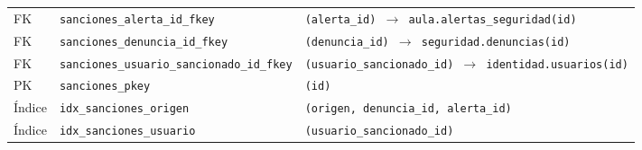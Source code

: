 {\begin{xltabular}{\textwidth}{@{}>{\raggedright\arraybackslash}p{1.7cm} >{\raggedright\arraybackslash}p{4.6cm} L@{}}
    FK & \texttt{sanciones\_\allowbreak{}alerta\_\allowbreak{}id\_\allowbreak{}fkey} & \texttt{(\allowbreak{}alerta\_\allowbreak{}id) $\rightarrow$ aula.alertas\_\allowbreak{}seguridad(\allowbreak{}id)} \\
    FK & \texttt{sanciones\_\allowbreak{}denuncia\_\allowbreak{}id\_\allowbreak{}fkey} & \texttt{(\allowbreak{}denuncia\_\allowbreak{}id) $\rightarrow$ seguridad.denuncias(\allowbreak{}id)} \\
    FK & \texttt{sanciones\_\allowbreak{}usuario\_\allowbreak{}sancionado\_\allowbreak{}id\_\allowbreak{}fkey} & \texttt{(\allowbreak{}usuario\_\allowbreak{}sancionado\_\allowbreak{}id) $\rightarrow$ identidad.usuarios(\allowbreak{}id)} \\
    PK & \texttt{sanciones\_\allowbreak{}pkey} & \texttt{(\allowbreak{}id)} \\
    Índice & \texttt{idx\_\allowbreak{}sanciones\_\allowbreak{}origen} & \texttt{(\allowbreak{}origen,\allowbreak{} denuncia\_\allowbreak{}id,\allowbreak{} alerta\_\allowbreak{}id)} \\
    Índice & \texttt{idx\_\allowbreak{}sanciones\_\allowbreak{}usuario} & \texttt{(\allowbreak{}usuario\_\allowbreak{}sancionado\_\allowbreak{}id)} \\
\end{xltabular}
}

